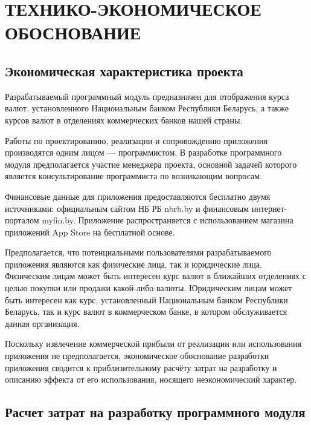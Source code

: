 \section[Технико-экономическое обоснование]{ТЕХНИКО-ЭКОНОМИЧЕСКОЕ ОБОСНОВАНИЕ}

\label{sec:teo}


\subsection{Экономическая характеристика проекта}

Разрабатываемый программный модуль предназначен для отображения курса валют,
установленного Национальным банком Республики Беларусь, а также курсов
валют в отделениях коммерческих банков нашей страны.

Работы по проектированию, реализации и сопровождению приложения
производятся одним лицом --- программистом.
В разработке программного модуля предполагается участие менеджера проекта,
основной задачей которого является консультирование программиста
по возникающим вопросам.

Финансовые данные для приложения предоставляются бесплатно двумя источниками:
официальным сайтом НБ РБ nbrb.by и финансовым интернет-порталом myfin.by.
Приложение распространяется с использованием магазина приложений App Store
на бесплатной основе.

Предполагается, что потенциальными пользователями разрабатываемого приложения
являются как физические лица, так и юридические лица. Физическим лицам может
быть интересен курс валют в ближайших отделениях с целью покупки или
продажи какой-либо валюты.
Юридическим лицам может быть интересен как курс, установленный Национальным
банком Республики Беларусь, так и курс валют в коммерческом банке,
в котором обслуживается данная организация.

Поскольку извлечение коммерческой прибыли от реализации или использования приложения
не предполагается, экономическое обоснование разработки приложения
сводится к приблизительному расчёту затрат на разработку и
описанию эффекта от его использования, носящего неэкономический характер.



\subsection{Расчет затрат на разработку программного модуля}

